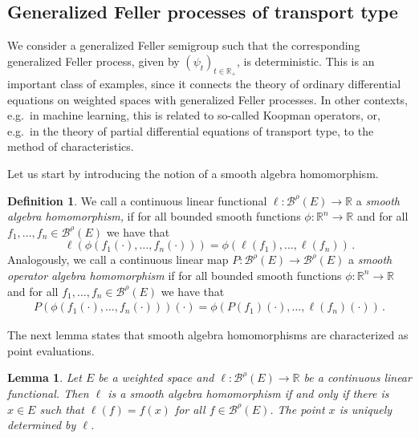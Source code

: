 \documentclass[a4paper,12pt]{article}
\newtheorem{lemma}[theorem]{Lemma}
\theoremstyle{definition}
\newtheorem{definition}[theorem]{Definition}
\theoremstyle{remark}
\numberwithin{equation}{section}
\numberwithin{theorem}{section}
\begin{document}
\subsection{Generalized Feller processes of transport type}\label{sec:transport}

We consider a generalized Feller semigroup such that the corresponding generalized Feller process, given by $\left(\psi_{t}\right)_{t\in\mathbb{R}_{+}}$,  is deterministic. This is an important class of examples, since it connects the theory of ordinary differential equations on weighted spaces with generalized Feller processes. In other contexts, e.g.~in machine learning, this is related to so-called Koopman operators, or, e.g.~in the theory of partial differential equations of transport type, to the method of characteristics.

Let us start by introducing the notion of a smooth algebra homomorphism.

\begin{definition}\label{def:OH}
We call a  continuous linear functional $\ell: \mathcal{\mathscr{B}}^{\rho}(E) \to \mathbb{R} $  a \emph{smooth algebra homomorphism,} if for all bounded smooth functions $\phi:\mathbb{R}^n \to \mathbb{R}$ and for all $f_1,\ldots,f_n \in \mathcal{\mathscr{B}}^{\rho}(E)$ we have that
$$
\ell(\phi(f_1(\cdot),\ldots,f_n(\cdot))) = \phi(\ell(f_1),\ldots,\ell(f_n)) \, .
$$
Analogously, we call a continuous linear map $P: \mathcal{\mathscr{B}}^{\rho}(E) \to \mathcal{\mathscr{B}}^{\rho}(E) $ a \emph{smooth operator algebra homomorphism} if for all bounded smooth functions $\phi:\mathbb{R}^n \to \mathbb{R}$ and for all $f_1,\ldots,f_n \in \mathcal{\mathscr{B}}^{\rho}(E)$ we have that
\begin{align}\label{eq:prop_soah}
P(\phi(f_1(\cdot),\ldots,f_n(\cdot)))(\cdot) = \phi(P(f_1)(\cdot),\ldots,\ell(f_n)(\cdot)) \, .
\end{align}
\end{definition}
The next lemma states that smooth algebra homomorphisms are characterized as point evaluations.
\begin{lemma}
Let $E$ be a weighted space and $\ell: \mathcal{\mathscr{B}}^{\rho}(E) \to \mathbb{R} $ be a continuous linear functional. Then $\ell$ is a smooth algebra homomorphism if and only if there is $x \in E$ such that $\ell(f) = f(x)$ for all $ f \in \mathcal{\mathscr{B}}^{\rho}(E)$. The point $x$ is uniquely determined by $\ell$.
\end{lemma}
\end{document}
